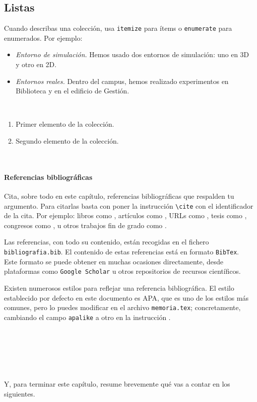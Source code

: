 \subsection{Listas}

Cuando describas una colección, usa \texttt{itemize} para ítems o \texttt{enumerate} para enumerados. Por ejemplo:

\begin{itemize}
 \item \textit{Entorno de simulación.} Hemos usado dos entornos de simulación: uno en 3D y otro en 2D.
 \item \textit{Entornos reales.} Dentro del campus, hemos realizado experimentos en Biblioteca y en el edificio de Gestión.
\end{itemize}\

\begin{enumerate}
 \item Primer elemento de la colección.
 \item Segundo elemento de la colección.
\end{enumerate}\

\paragraph{Referencias bibliográficas}
\label{sec:referencias}

Cita, sobre todo en este capítulo, referencias bibliográficas que respalden tu argumento. Para citarlas basta con poner la instrucción \verb|\cite| con el identificador de la cita. Por ejemplo: libros como \cite{vega12e}, artículos como \cite{vega19b}, URLs como \cite{vega19a}, tesis como \cite{vega18b}, congresos como \cite{vega18a}, u otros trabajos fin de grado como \cite{vega08b}.

Las referencias, con todo su contenido, están recogidas en el fichero \texttt{bibliografia.bib}. El contenido de estas referencias está en formato \texttt{BibTex}. Este formato se puede obtener en muchas ocasiones directamente, desde plataformas como \texttt{Google Scholar} u otros repositorios de recursos científicos.

Existen numerosos estilos para reflejar una referencia bibliográfica. El estilo establecido por defecto en este documento es APA, que es uno de los estilos más comunes, pero lo puedes modificar en el archivo \texttt{memoria.tex}; concretamente, cambiando el campo \verb|apalike| a otro en la instrucción \verb||. 

\

\

\

Y, para terminar este capítulo, resume brevemente qué vas a contar en los siguientes.
